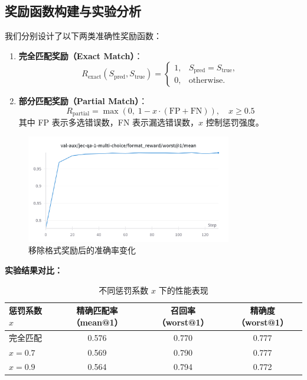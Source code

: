 \documentclass{pkuthesis}
\begin{document}
\subsection{奖励函数构建与实验分析}

我们分别设计了以下两类准确性奖励函数：

\begin{enumerate}[label=(\arabic*)]
  \item \textbf{完全匹配奖励（Exact Match）}：
    \[
    R_{\mathrm{exact}}(S_{\mathrm{pred}}, S_{\mathrm{true}})
      = \begin{cases}
          1, & S_{\mathrm{pred}} = S_{\mathrm{true}},\\
          0, & \text{otherwise}.
        \end{cases}
    \]
  \item \textbf{部分匹配奖励（Partial Match）}：
    \[
    R_{\mathrm{partial}} = \max\left(0,\;1 - x \cdot (\mathrm{FP} + \mathrm{FN})\right),\quad x \ge 0.5
    \]
    其中 FP 表示多选错误数，FN 表示漏选错误数，$x$ 控制惩罚强度。
\end{enumerate}

\begin{figure}[h]
  \centering
  \includegraphics[width=0.8\textwidth]{figures/format.png}
  \caption{移除格式奖励后的准确率变化}
  \label{fig:format}
\end{figure}

\textbf{实验结果对比：}

\begin{table}[h]
  \centering
  \caption{不同惩罚系数 $x$ 下的性能表现}
  \begin{tabular}{l|c|c|c}
    \hline
    惩罚系数 $x$ & 精确匹配率（mean@1） & 召回率（worst@1） & 精确度（worst@1） \\
    \hline
    完全匹配 & 0.576 & 0.770 & 0.777 \\
    $x=0.7$  & 0.569 & 0.790 & 0.777 \\
    $x=0.9$  & 0.564 & 0.794 & 0.772 \\
    \hline
  \end{tabular}
\end{table}
\end{document}
